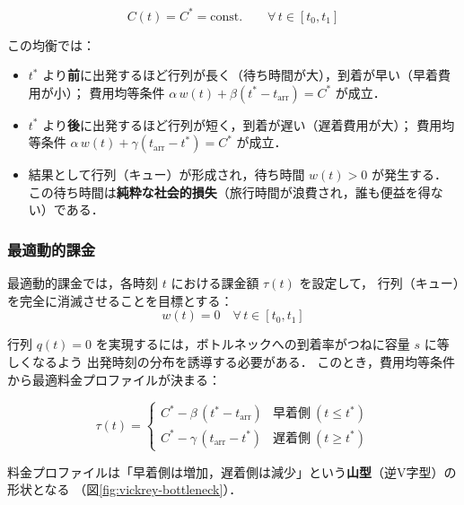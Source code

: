 \begin{equation}
  C(t) = C^* = \text{const.}
  \qquad \forall\, t \in [t_0, t_1]
  \label{eq:departure-equilibrium}
\end{equation}

この均衡では：
\begin{itemize}
  \item $t^*$ より\textbf{前}に出発するほど行列が長く（待ち時間が大），到着が早い（早着費用が小）；
        費用均等条件 $\alpha\, w(t) + \beta(t^* - t_{\text{arr}}) = C^*$ が成立．
  \item $t^*$ より\textbf{後}に出発するほど行列が短く，到着が遅い（遅着費用が大）；
        費用均等条件 $\alpha\, w(t) + \gamma(t_{\text{arr}} - t^*) = C^*$ が成立．
  \item 結果として行列（キュー）が形成され，待ち時間 $w(t) > 0$ が発生する．
        この待ち時間は\textbf{純粋な社会的損失}（旅行時間が浪費され，誰も便益を得ない）である．
\end{itemize}

\subsubsection*{最適動的課金}

最適動的課金では，各時刻 $t$ における課金額 $\tau(t)$ を設定して，
行列（キュー）を完全に消滅させることを目標とする：
\begin{equation}
  w(t) = 0
  \quad \forall\, t \in [t_0, t_1]
  \label{eq:queue-free}
\end{equation}

行列 $q(t) = 0$ を実現するには，ボトルネックへの到着率がつねに容量 $s$ に等しくなるよう
出発時刻の分布を誘導する必要がある．
このとき，費用均等条件から最適料金プロファイルが決まる：

\begin{equation}
  \tau(t) =
  \begin{cases}
    C^* - \beta\,(t^* - t_{\text{arr}}) & \text{早着側}\ (t \leq t^*) \\
    C^* - \gamma\,(t_{\text{arr}} - t^*) & \text{遅着側}\ (t \geq t^*)
  \end{cases}
  \label{eq:optimal-dynamic-toll}
\end{equation}

料金プロファイルは「早着側は増加，遅着側は減少」という\textbf{山型}（逆V字型）の形状となる
（図\ref{fig:vickrey-bottleneck}）．

